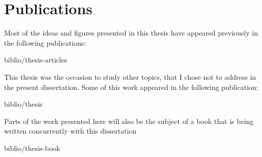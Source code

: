 

\chapter*{Publications} %

Most of the ideas and figures presented in this thesis have appeared previously in the following publications:

\smallskip


\begin{btSect}{biblio/thesis-articles}
\btPrintAll
\end{btSect}

\bigskip

This thesis was the occasion to study other topics, that I chose
not to address in the present dissertation. Some of this work appeared in the following
publication:

\smallskip


\begin{btSect}{biblio/thesis}
\btPrintAll
\end{btSect}

\bigskip

Parts of the work presented here will also be the subject of a book that
is being written concurrently with this dissertation

\smallskip


\begin{btSect}{biblio/thesis-book}
\btPrintAll
\end{btSect}
